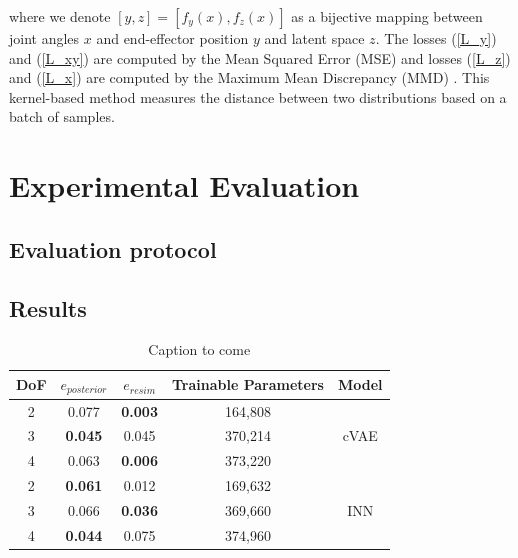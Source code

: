 \documentclass[conference]{IEEEtran}
\begin{document}
where we denote $[y, z] = [f_y(x), f_z(x)]$ as a bijective mapping between joint angles $x$ and end-effector position $y$ and latent space $z$. The losses (\ref{L_y}) and (\ref{L_xy}) are computed by the Mean Squared Error (MSE) and losses (\ref{L_z}) and (\ref{L_x}) are computed by the Maximum Mean Discrepancy (MMD) \cite{Gretton2008}. This kernel-based method measures the distance between two distributions based on a batch of samples.

\section*{Experimental Evaluation}

\subsection*{Evaluation protocol}
\subsection*{Results}

\begin{table}[h]
    \centering
    \begin{tabular}{|c|c|c|c|c|}
        \hline
        DoF & $e_{posterior}$ & $e_{resim}$    & Trainable Parameters & Model \\
        \hline
        2   & 0.077           & \textbf{0.003} & 164,808              &       \\
        3   & \textbf{0.045}  & 0.045          & 370,214              & cVAE  \\
        4   & 0.063           & \textbf{0.006} & 373,220              &       \\
        \hline
        2   & \textbf{0.061}  & 0.012          & 169,632              &       \\
        3   & 0.066           & \textbf{0.036} & 369,660              & INN   \\
        4   & \textbf{0.044}  & 0.075          & 374,960              &       \\
        \hline
    \end{tabular}
    \caption{\label{tab:results} Caption to come}
\end{table}
\end{document}
